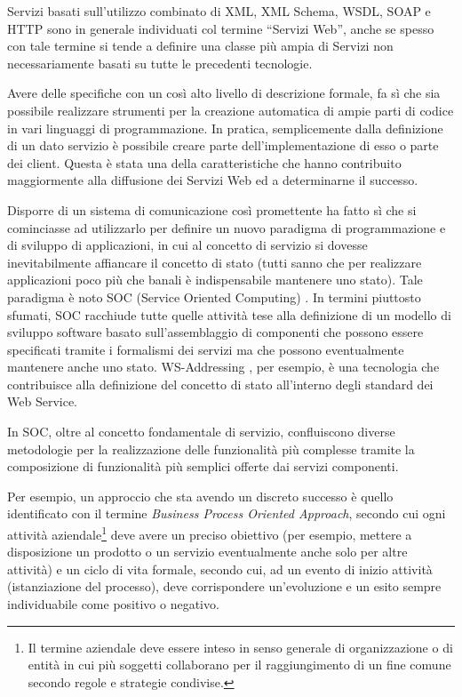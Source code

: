 Servizi basati sull'utilizzo combinato di XML, XML Schema, WSDL, SOAP e HTTP
sono in generale individuati col termine ``Servizi Web'', anche se spesso con
tale termine si tende a definire una classe più ampia di Servizi non necessariamente basati su tutte le
precedenti tecnologie.

Avere delle specifiche con un così alto livello di descrizione formale, fa sì
che sia possibile realizzare strumenti per la creazione
automatica di ampie parti di codice in vari linguaggi di programmazione. In
pratica, semplicemente dalla definizione di un dato servizio è possibile creare
parte dell'implementazione di esso o parte dei client. Questa è stata una della
caratteristiche che hanno contribuito maggiormente alla diffusione dei Servizi
Web ed a determinarne il successo.

Disporre di un sistema di comunicazione così promettente ha fatto sì che si
cominciasse ad utilizzarlo per definire un nuovo paradigma di programmazione 
e di sviluppo di applicazioni, in cui al concetto di servizio si dovesse
inevitabilmente affiancare il concetto di stato (tutti sanno che per
realizzare applicazioni poco più che banali è indispensabile mantenere uno
stato). Tale paradigma è noto SOC (Service Oriented Computing) \cite{SOC1}
\cite{WEBSERVICES}. In termini piuttosto sfumati, SOC racchiude tutte quelle attività tese alla
definizione di un modello di sviluppo software basato sull'assemblaggio di componenti che possono essere
specificati tramite i formalismi dei servizi ma che possono eventualmente
mantenere anche uno stato. WS-Addressing \cite{WS-Addressing}, per esempio, è
una tecnologia che contribuisce alla definizione del concetto di stato all'interno degli standard
dei Web Service.

In SOC, oltre al concetto fondamentale di servizio, confluiscono diverse
metodologie per la realizzazione delle funzionalità più complesse tramite la
composizione di funzionalità più semplici offerte dai servizi componenti.

Per esempio, un approccio che sta avendo un discreto successo è quello
identificato con il termine \emph{Business Process Oriented Approach}, secondo
cui ogni attività aziendale\footnote{Il termine aziendale deve essere inteso in
senso generale di organizzazione o di entità in cui più soggetti collaborano
per il raggiungimento di un fine comune secondo regole e strategie condivise.} deve
avere un preciso obiettivo (per esempio, mettere a disposizione un prodotto o un
servizio eventualmente anche solo per altre attività) e un ciclo di vita
formale, secondo cui, ad un evento di inizio attività (istanziazione del
processo), deve corrispondere un'evoluzione e un esito sempre individuabile
come positivo o negativo.

